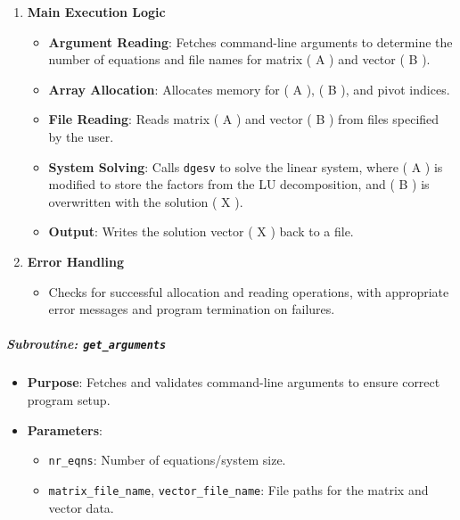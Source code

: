 \begin{enumerate}
\begin{itemize}
\begin{itemize}
\item \texttt{n}, \texttt{nrhs}, \texttt{a}, \texttt{lda}, \texttt{ipiv}, \texttt{b}, \texttt{ldb}, and \texttt{info} describe the system dimensions, matrix and vector storage details, and output for status information.
\end{itemize}
\end{itemize}


\item \textbf{Main Execution Logic}

\begin{itemize}
\item \textbf{Argument Reading}: Fetches command-line arguments to determine the number of equations and file names for matrix ( A ) and vector ( B ).
\item \textbf{Array Allocation}: Allocates memory for ( A ), ( B ), and pivot indices.
\item \textbf{File Reading}: Reads matrix ( A ) and vector ( B ) from files specified by the user.
\item \textbf{System Solving}: Calls \texttt{dgesv} to solve the linear system, where ( A ) is modified to store the factors from the LU decomposition, and ( B ) is overwritten with the solution ( X ).
\item \textbf{Output}: Writes the solution vector ( X ) back to a file.
\end{itemize}


\item \textbf{Error Handling}

\begin{itemize}
\item Checks for successful allocation and reading operations, with appropriate error messages and program termination on failures.
\end{itemize}
\end{enumerate}

\subparagraph{Subroutine: \texttt{get\_arguments}}

\begin{itemize}
\item \textbf{Purpose}: Fetches and validates command-line arguments to ensure correct program setup.
\item \textbf{Parameters}:

\begin{itemize}
\item \texttt{nr\_eqns}: Number of equations/system size.
\item \texttt{matrix\_file\_name}, \texttt{vector\_file\_name}: File paths for the matrix and vector data.
\end{itemize}
\end{itemize}

